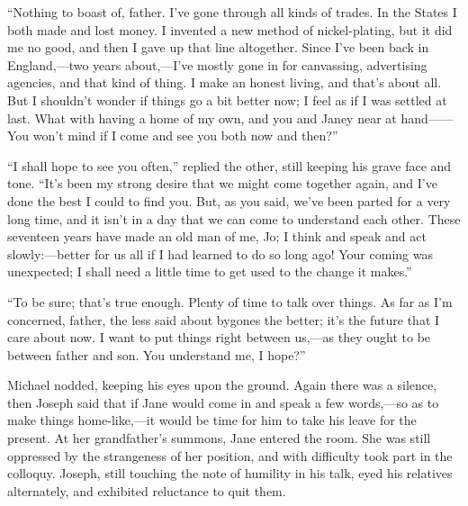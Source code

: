 ``Nothing to boast of, father. I've gone through all kinds of trades. In
the States I both made and lost money. I invented a new method of
nickel-plating, but it did me no good, and then I gave up that line
altogether. Since I've been back in England,---two years about,---I've
mostly gone in for canvassing, {}advertising agencies, and that kind of
thing. I make an honest living, and that's about all. But I shouldn't
wonder if things go a bit better now; I feel as if I was settled at
last. What with having a home of my own, and you and Janey near at
hand{{------}} You won't mind if I come and see you both now and then?''

``I shall hope to see you often,'' replied the other, still keeping his
grave face and tone. ``It's been my strong desire that we might come
together again, and I've done the best I could to find you. But, as you
said, we've been parted for a very long time, and it isn't in a day that
we can come to understand each other. These seventeen years have made an
old man of me, Jo; I think and speak and act slowly:---better for us all
if I had learned to do so long ago! Your coming was unexpected; I shall
need a little time to get used to the change it makes.''

``To be sure; that's true enough. Plenty of time to talk over things. As
far as I'm concerned, father, the less said about bygones {}the better;
it's the future that I care about now. I want to put things right
between us,---as they ought to be between father and son. You understand
me, I hope?''

Michael nodded, keeping his eyes upon the ground. Again there was a
silence, then Joseph said that if Jane would come in and speak a few
words,---so as to make things home-like,---it would be time for him to
take his leave for the present. At her grandfather's summons, Jane
entered the room. She was still oppressed by the strangeness of her
position, and with difficulty took part in the colloquy. Joseph, still
touching the note of humility in his talk, eyed his relatives
alternately, and exhibited reluctance to quit them.

